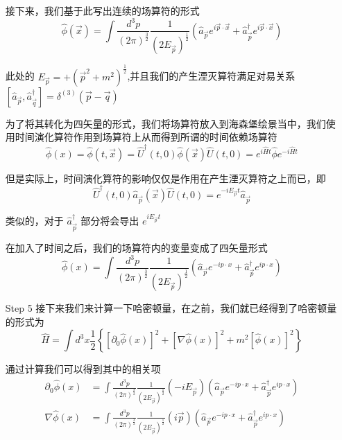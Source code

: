 \begin{itemize}
    接下来，我们基于此写出连续的场算符的形式
    \begin{equation*}
        \hat{\phi}(\vec{x}) = \int \frac{d^3p}{(2\pi)^{\frac{3}{2}}}\frac{1}{(2E_{\vec{p}})^\frac{1}{2}}\left(\hat{a}_{\vec{p}}e^{i\vec{p}\cdot \vec{x}} + \hat{a}_{\vec{p}}^\dagger e^{i\vec{p}\cdot\vec{x}}\right)
    \end{equation*}

    此处的 $E_{\vec{p}} = +\left(\vec{p}^2 + m^2\right)^{\frac{1}{2}}$,并且我们的产生湮灭算符满足对易关系 $\left[\hat{a}_{\vec{p}},\hat{a}_{\vec{q}}^\dagger\right] = \delta^{(3)}(\vec{p}-\vec{q})$ 

    为了将其转化为四矢量的形式，我们将场算符放入到海森堡绘景当中，我们使用时间演化算符作用到场算符上从而得到所谓的时间依赖场算符
    \begin{equation*}
        \hat{\phi}(x) = \hat{\phi}(t,\vec{x}) = \hat{U}^\dagger (t,0)\hat{\phi}(\vec{x})\hat{U}(t,0) = e^{i\hat{H}t}\hat{\phi}e^{-i\hat{H}t}
    \end{equation*}

    但是实际上，时间演化算符的影响仅仅是作用在产生湮灭算符之上而已，即 
    \begin{equation*}
        \hat{U}^\dagger (t,0)\hat{a}_{\vec{p}}(\vec{x})\hat{U}(t,0) = e^{-iE_{\vec{p}}t}\hat{a}_{\vec{p}}
    \end{equation*}

    类似的，对于 $\hat{a}_{\vec{p}}^\dagger$ 部分将会导出 $e^{iE_{\vec{p}}t}$

    在加入了时间之后，我们的场算符内的变量变成了四矢量形式
    \begin{equation*}
        \hat{\phi}(x) = \int \frac{d^3p}{\left(2\pi\right)^{\frac{3}{2}}}\frac{1}{\left(2E_{\vec{p}}\right)^{\frac{1}{2}}}\left(\hat{a}_{\vec{p}}e^{-ip\cdot x} + \hat{a}_{\vec{p}}^\dagger e^{ip\cdot x}\right)
    \end{equation*}

    \item[Step 5] 接下来我们来计算一下哈密顿量，在之前，我们就已经得到了哈密顿量的形式为
    \begin{equation*}
        \hat{H} = \int d^3x\frac{1}{2}\left\{\left[\partial_0 \hat{\phi}(x)\right]^2 + \left[\nabla\hat{\phi}(x)\right]^2 +m^2 \left[\hat{\phi}(x)\right]^2\right\}
    \end{equation*}

    通过计算我们可以得到其中的相关项
    \begin{align*}
        \partial_0\hat{\phi}(x) &= \int \frac{d^3p}{\left(2\pi\right)^{\frac{3}{2}}}\frac{1}{\left(2E_{\vec{p}}\right)^{\frac{1}{2}}}\left(-iE_{\vec{p}}\right)\left(\hat{a}_{\vec{p}}e^{-ip\cdot x} + \hat{a}_{\vec{p}}^\dagger e^{ip\cdot x}\right) \\
        \nabla \hat{\phi}(x) &= \int \frac{d^3p}{\left(2\pi\right)^{\frac{3}{2}}}\frac{1}{\left(2E_{\vec{p}}\right)^{\frac{1}{2}}}\left(i\vec{p}\right)\left(\hat{a}_{\vec{p}}e^{-ip\cdot x} + \hat{a}_{\vec{p}}^\dagger e^{ip\cdot x}\right)
    \end{align*}


\end{itemize}
